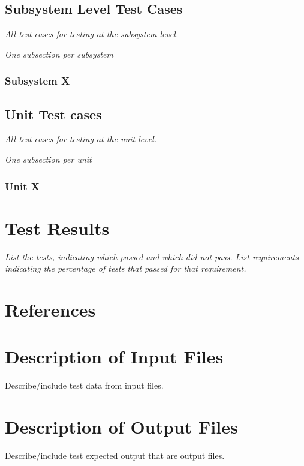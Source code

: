 \documentclass[12pt]{article}
\begin{document}
\subsection{Subsystem Level Test Cases}

{\it
All test cases for testing at the subsystem level.
}

{\it
One subsection per subsystem
}

\subsubsection{Subsystem X}

\subsection{Unit Test cases}

{\it
All test cases for testing at the unit level.
}

{\it
One subsection per unit
}

\subsubsection{Unit X}

\section{Test Results}

{\it
List the tests, indicating which passed and which did not pass.
List requirements indicating the percentage of tests that passed for that requirement.
}

\section{References}

\appendix

\section{Description of Input Files}

Describe/include test data from input files.

\section{Description of Output Files}

Describe/include test expected output that are output files.
\end{document}
